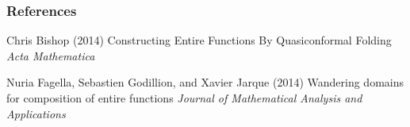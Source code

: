 \documentclass{beamer}
\begin{document}








\begin{frame}
\frametitle{References}
\footnotesize{
\begin{thebibliography}{99} %
  Chris Bishop (2014)
\newblock Constructing Entire Functions By Quasiconformal Folding
\newblock \emph{Acta Mathematica}

 Nuria Fagella, Sebastien Godillion, and Xavier Jarque (2014)
\newblock Wandering domains for composition of entire functions
\newblock \emph{Journal of Mathematical Analysis and Applications} 


\end{thebibliography}
}
\end{frame}


\end{document}

